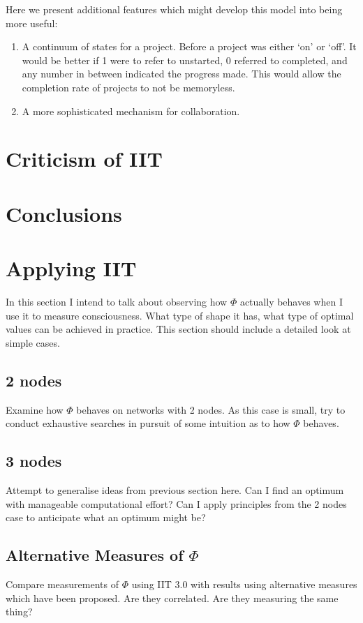 Here we present additional features which might develop this model into being more useful:

\begin{enumerate}
	\item A continuum of states for a project. Before a project was either `on' or `off'. It would be better if 1 were to refer to unstarted, 0 referred to completed, and any number in between indicated the progress made. This would allow the completion rate of projects to not be memoryless.
	\item A more sophisticated mechanism for collaboration. 
\end{enumerate}

\section{Criticism of IIT}

\section{Conclusions}

\section{Applying IIT}
In this section I intend to talk about observing how $\Phi$ actually behaves when I use it to measure consciousness. What type of shape it has, what type of optimal values can be achieved in practice. This section should include a detailed look at simple cases.

\subsection{2 nodes}
Examine how $\Phi$ behaves on networks with 2 nodes. As this case is small, try to conduct exhaustive searches in pursuit of some intuition as to how $\Phi$ behaves.
\subsection{3 nodes}
Attempt to generalise ideas from previous section here. Can I find an optimum with manageable computational effort? Can I apply principles from the 2 nodes case to anticipate what an optimum might be?

\subsection{Alternative Measures of $\Phi$}
Compare measurements of $\Phi$ using IIT 3.0 with results using alternative measures which have been proposed. Are they correlated. Are they measuring the same thing?

